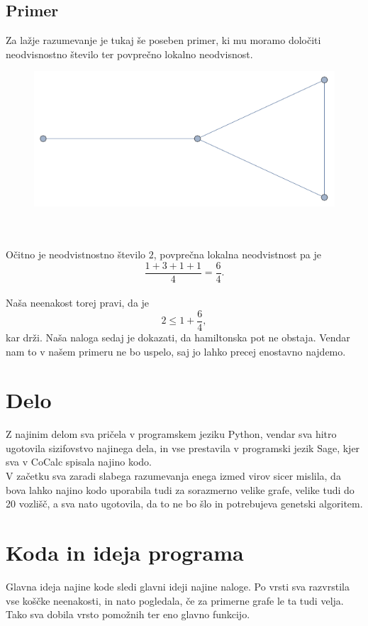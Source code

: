 \documentclass[12pt,a4paper]{amsart}
\theoremstyle{definition} %
\theoremstyle{plain} %
\begin{document}
\subsection{Primer}
Za lažje razumevanje je tukaj še poseben primer, ki mu moramo določiti neodvisnostno število ter povprečno lokalno neodvisnost.\\
\begin{figure}[h]
	\centering
	\includegraphics{slike/grafek}
\end{figure}
\\
\\
Očitno je neodvistnostno število $2$, povprečna lokalna neodvistnost pa je\\ $$\frac{1+3+1+1}{4}=\frac{6}{4}.$$
\ \\
Naša neenakost torej pravi, da je $$2 \leq 1+ \frac{6}{4},$$ kar drži. Naša naloga sedaj je dokazati, da hamiltonska pot ne obstaja. Vendar nam to v našem primeru ne bo uspelo, saj jo lahko precej enostavno najdemo.
\section{Delo}
Z najinim delom sva pričela v programskem jeziku Python, vendar sva hitro ugotovila sizifovstvo najinega dela, in vse prestavila v programski jezik Sage, kjer sva v CoCalc spisala najino kodo. \\
V začetku sva zaradi slabega razumevanja enega izmed virov sicer mislila, da bova lahko najino kodo uporabila tudi za sorazmerno velike grafe, velike tudi do 20 vozlišč, a sva nato ugotovila, da to ne bo šlo in potrebujeva genetski algoritem.
\section{Koda in ideja programa}
Glavna ideja najine kode sledi glavni ideji najine naloge. Po vrsti sva razvrstila vse koščke neenakosti, in nato pogledala, če za primerne grafe le ta tudi velja. Tako sva dobila vrsto pomožnih ter eno glavno funkcijo.
\end{document}
